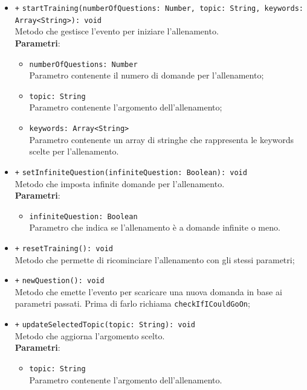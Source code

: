 \begin{itemize}
\begin{itemize}
		\item \texttt{+} \texttt{startTraining(numberOfQuestions: Number, topic: String, keywords:\\ Array<String>): void} \\
		Metodo che gestisce l'evento per iniziare l'allenamento. \\
		\textbf{Parametri}:
		\begin{itemize}
			\item \texttt{numberOfQuestions: Number} \\
			Parametro contenente il numero di domande per l'allenamento;
			\item \texttt{topic: String} \\
			Parametro contenente l'argomento dell'allenamento;
			\item \texttt{keywords: Array<String>} \\
			Parametro contenente un array di stringhe che rappresenta le keywords scelte per l'allenamento.
		\end{itemize}
		\item \texttt{+} \texttt{setInfiniteQuestion(infiniteQuestion: Boolean): void} \\
		Metodo che imposta infinite domande per l'allenamento. \\
		\textbf{Parametri}:
		\begin{itemize}
			\item \texttt{infiniteQuestion: Boolean} \\
			Parametro che indica se l'allenamento è a domande infinite o meno.
		\end{itemize}
		\item \texttt{+} \texttt{resetTraining(): void} \\
		Metodo che permette di ricominciare l'allenamento con gli stessi parametri; 
		\item \texttt{+} \texttt{newQuestion(): void} \\
		Metodo che emette l'evento per scaricare una nuova domanda in base ai parametri passati. Prima di farlo richiama \texttt{checkIfICouldGoOn}; 
		\item \texttt{+} \texttt{updateSelectedTopic(topic: String): void} \\
		Metodo che aggiorna l'argomento scelto. \\
		\textbf{Parametri}:
		\begin{itemize}
			\item \texttt{topic: String} \\
			Parametro contenente l'argomento dell'allenamento.

\end{itemize}
\end{itemize}
\end{itemize}
